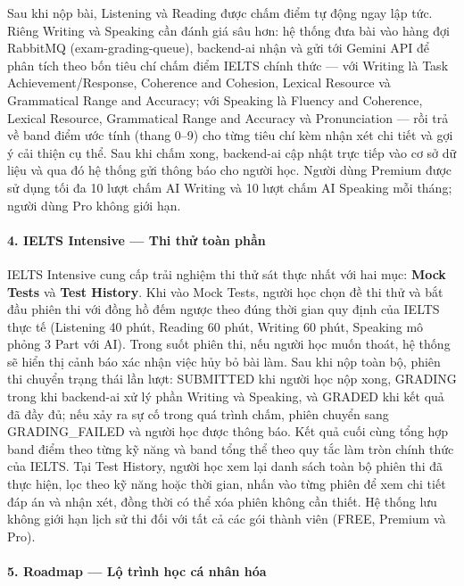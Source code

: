 Sau khi nộp bài, Listening và Reading được chấm điểm tự động ngay lập tức. Riêng Writing và Speaking cần đánh giá sâu hơn: hệ thống đưa bài vào hàng đợi RabbitMQ (exam-grading-queue), backend-ai nhận và gửi tới Gemini API để phân tích theo bốn tiêu chí chấm điểm IELTS chính thức --- với Writing là Task Achievement/Response, Coherence and Cohesion, Lexical Resource và Grammatical Range and Accuracy; với Speaking là Fluency and Coherence, Lexical Resource, Grammatical Range and Accuracy và Pronunciation --- rồi trả về band điểm ước tính (thang 0--9) cho từng tiêu chí kèm nhận xét chi tiết và gợi ý cải thiện cụ thể. Sau khi chấm xong, backend-ai cập nhật trực tiếp vào cơ sở dữ liệu và qua đó hệ thống gửi thông báo cho người học. Người dùng Premium được sử dụng tối đa 10 lượt chấm AI Writing và 10 lượt chấm AI Speaking mỗi tháng; người dùng Pro không giới hạn.

\paragraph{4. IELTS Intensive --- Thi thử toàn phần}

IELTS Intensive cung cấp trải nghiệm thi thử sát thực nhất với hai mục: \textbf{Mock Tests} và \textbf{Test History}. Khi vào Mock Tests, người học chọn đề thi thử và bắt đầu phiên thi với đồng hồ đếm ngược theo đúng thời gian quy định của IELTS thực tế (Listening 40 phút, Reading 60 phút, Writing 60 phút, Speaking mô phỏng 3 Part với AI). Trong suốt phiên thi, nếu người học muốn thoát, hệ thống sẽ hiển thị cảnh báo xác nhận việc hủy bỏ bài làm. Sau khi nộp toàn bộ, phiên thi chuyển trạng thái lần lượt: SUBMITTED khi người học nộp xong, GRADING trong khi backend-ai xử lý phần Writing và Speaking, và GRADED khi kết quả đã đầy đủ; nếu xảy ra sự cố trong quá trình chấm, phiên chuyển sang GRADING\_FAILED và người học được thông báo. Kết quả cuối cùng tổng hợp band điểm theo từng kỹ năng và band tổng thể theo quy tắc làm tròn chính thức của IELTS. Tại Test History, người học xem lại danh sách toàn bộ phiên thi đã thực hiện, lọc theo kỹ năng hoặc thời gian, nhấn vào từng phiên để xem chi tiết đáp án và nhận xét, đồng thời có thể xóa phiên không cần thiết. Hệ thống lưu không giới hạn lịch sử thi đối với tất cả các gói thành viên (FREE, Premium và Pro).

\paragraph{5. Roadmap --- Lộ trình học cá nhân hóa}

